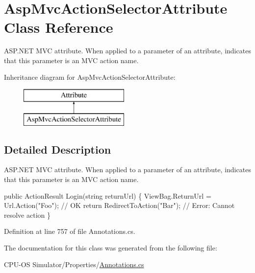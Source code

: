 \hypertarget{class_asp_mvc_action_selector_attribute}{}\section{Asp\+Mvc\+Action\+Selector\+Attribute Class Reference}
\label{class_asp_mvc_action_selector_attribute}


A\+S\+P.\+N\+E\+T M\+V\+C attribute. When applied to a parameter of an attribute, indicates that this parameter is an M\+V\+C action name.  


Inheritance diagram for Asp\+Mvc\+Action\+Selector\+Attribute\+:\begin{figure}[H]
\begin{center}
\leavevmode
\includegraphics[height=2.000000cm]{class_asp_mvc_action_selector_attribute}
\end{center}
\end{figure}


\subsection{Detailed Description}
A\+S\+P.\+N\+E\+T M\+V\+C attribute. When applied to a parameter of an attribute, indicates that this parameter is an M\+V\+C action name. 


\begin{DoxyCode}
\textcolor{keyword}{public} ActionResult Login(\textcolor{keywordtype}{string} returnUrl) \{
  ViewBag.ReturnUrl = Url.Action(\textcolor{stringliteral}{"Foo"}); \textcolor{comment}{// OK}
  \textcolor{keywordflow}{return} RedirectToAction(\textcolor{stringliteral}{"Bar"}); \textcolor{comment}{// Error: Cannot resolve action}
\}
\end{DoxyCode}


Definition at line 757 of file Annotations.\+cs.



The documentation for this class was generated from the following file\+:\begin{DoxyCompactItemize}
\item 
C\+P\+U-\/\+O\+S Simulator/\+Properties/\hyperlink{_annotations_8cs}{Annotations.\+cs}\end{DoxyCompactItemize}
